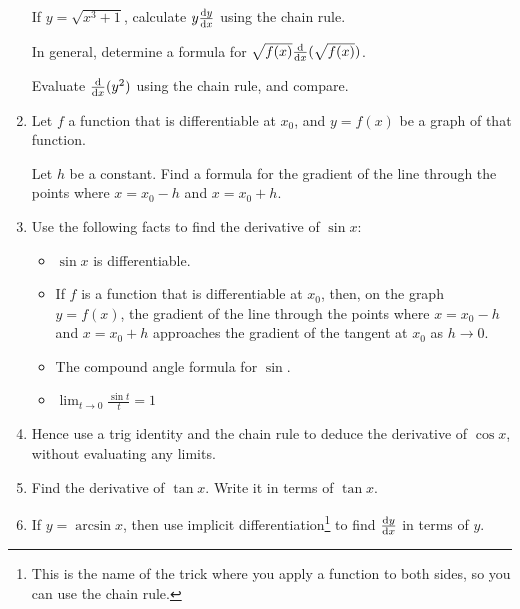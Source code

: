 \begin{enumerate}
  If \(y = \sqrt{x^3 + 1}\), calculate \(y \dv<y>{x}\) using the chain rule.

  In general, determine a formula for \(\sqrt{f(x)}\dv{x}(\sqrt{f(x)})\).

  Evaluate \(\dv{x}(y^2)\) using the chain rule, and compare.
 \item
  Let \(f\) a function that is differentiable at \(x_0\), and \(y = f(x)\) be a
  graph of that function.

  Let \(h\) be a constant. Find a formula for the gradient of the line through
  the points where \(x = x_0 - h\) and \(x = x_0 + h\).
 \item
  Use the following facts to find the derivative of \(\sin x\):
  \begin{itemize}
   \item
    \(\sin x\) is differentiable.
   \item
    If \(f\) is a function that is differentiable at \(x_0\), then, on the graph
    \(y = f(x)\), the gradient of the line through the points where
    \(x = x_0 - h\) and \(x = x_0 + h\) approaches the gradient of the tangent
    at \(x_0\) as \(h \to 0\).
   \item
    The compound angle formula for \(\sin\).
   \item
    \(\displaystyle
     \lim_{t \to 0} \frac{\sin t} t = 1
     \)
  \end{itemize}
 \item
  Hence use a trig identity and the chain rule to deduce the derivative of
  \(\cos x\), without evaluating any limits.
 \item
  Find the derivative of \(\tan x\). Write it in terms of \(\tan x\).
 \item \label{q_calc_arcsin}
  If \(y = \arcsin x\), then use implicit differentiation\footnote{
   This is the name of the trick where you apply a function to both sides, so
   you can use the chain rule.
  } to find
  \(\dv<y>{x}\) in terms of \(y\).


\end{enumerate}
